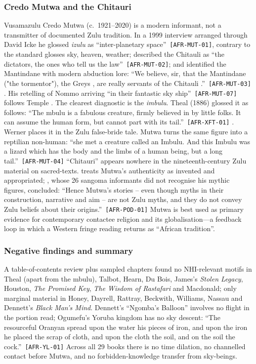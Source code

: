 \documentclass[11pt,a4paper]{article}
\newcommand{\pid}[1]{\texttt{\small #1}}
\begin{document}
\subsubsection{Credo Mutwa and the Chitauri}

Vusamazulu Credo Mutwa (c.~1921--2020) is a modern informant, not a transmitter of documented Zulu tradition. In a 1999 interview arranged through David Icke he glossed \emph{izulu} as \enquote{inter-planetary space}~\pid{[AFR-MUT-01]}, contrary to the standard glosses sky, heaven, weather; described the Chitauli as \enquote{the dictators, the ones who tell us the law}~\pid{[AFR-MUT-02]}; and identified the Mantindane with modern abduction lore: \enquote{We believe, sir, that the Mantindane ("the tormentor"), the Greys , are really servants of the Chitauli .}~\pid{[AFR-MUT-03]} \parencite{martin1999mutwa}. His retelling of Nommo arriving \enquote{in their fantastic sky ship}~\pid{[AFR-MUT-07]} follows Temple \parencite{mutwa_web}. The clearest diagnostic is the \emph{imbulu}. Theal (1886) glossed it as follows: \enquote{The mbulu is a fabulous creature, firmly believed in by little folks. It can assume the human form, but cannot part with its tail.}~\pid{[AFR-XFT-01]} \parencite{theal1886kaffir}. Werner places it in the Zulu false-bride tale. Mutwa turns the same figure into a reptilian non-human: \enquote{she met a creature called an Imbulu. And this Imbulu was a lizard which has the body and the limbs of a human being, but a long tail.}~\pid{[AFR-MUT-04]} ``Chitauri'' appears nowhere in the nineteenth-century Zulu material on sacred-texts. \textcite{chidester2002mutwa} treats Mutwa's authenticity as invented and appropriated; \textcite{podolecka2023mutwa}, whose 26 sangoma informants did not recognise his mythic figures, concluded: \enquote{Hence Mutwa’s stories – even though myths in their construction, narrative and aim – are not Zulu myths, and they do not convey Zulu beliefs about their origins.}~\pid{[AFR-POD-01]} Mutwa is best used as primary evidence for contemporary contactee religion and its globalisation---a feedback loop in which a Western fringe reading returns as ``African tradition''.

\subsubsection{Negative findings and summary}

A table-of-contents review plus sampled chapters found no NHI-relevant motifs in Theal (apart from the mbulu), Talbot, Hearn, Du Bois, James's \emph{Stolen Legacy}, Houston, \emph{The Promised Key}, \emph{The Wisdom of Rastafari} and Macdonald; only marginal material in Honey, Dayrell, Rattray, Beckwith, Williams, Nassau and Dennett's \emph{Black Man's Mind}. Dennett's ``Ngomba's Balloon'' involves no flight in the portion read; Ogumefu's Yoruba kingdom has no sky descent: \enquote{The resourceful Oranyan spread upon the water his pieces of iron, and upon the iron he placed the scrap of cloth, and upon the cloth the soil, and on the soil the cock.}~\pid{[AFR-YL-01]} Across all 29 books there is no time dilation, no channelled contact before Mutwa, and no forbidden-knowledge transfer from sky-beings.
\end{document}
